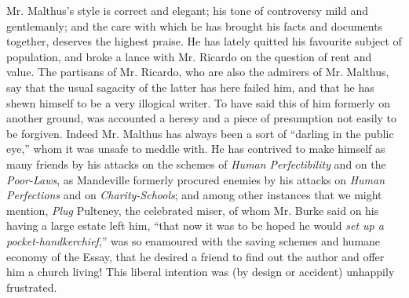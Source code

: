 Mr. Malthus's style is correct and elegant; his tone of
controversy mild and gentlemanly; and the care with which he has
brought his facts and documents together, deserves the highest
praise. He has lately quitted his favourite subject of population,
and broke a lance with Mr. Ricardo on the question of rent and
value. The partisans of Mr. Ricardo, who are also the admirers of
Mr. Malthus, say that the usual sagacity of the latter has here
failed him, and that he has shewn himself to be a very illogical
writer. To have said this of him formerly on another ground, was
accounted a heresy and a piece of presumption not easily to be
forgiven. Indeed Mr. Malthus has always been a sort of ``darling
in the public eye,'' whom it was unsafe to meddle with. He has
contrived to make himself as many friends by his attacks on the
schemes of \emph{Human Perfectibility} and on the
\emph{Poor-Laws}, as Mandeville formerly procured enemies by his
attacks on \emph{Human Perfections} and on \emph{Charity-Schools};
and among other instances that we might mention, \emph{Plug}
Pulteney, the celebrated miser, of whom Mr. Burke said on his
having a large estate left him, ``that now it was to be hoped he
would \emph{set up a pocket-handkerchief},'' was so enamoured with
the saving schemes and humane economy of the Essay, that he
desired a friend to find out the author and offer him a church
living! This liberal intention was (by design or accident)
unhappily frustrated.